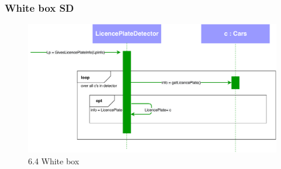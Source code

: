 \newpage
\subsubsection{White box SD}
\creator{\studentA}

\begin{figure}[H]
    \centering
    \includegraphics[width=\textwidth]{Iteration_3/Files/UC4_wb1.pdf}
    \caption{6.4 White box}
    \label{fig:6.2 Greybox}
\end{figure}
